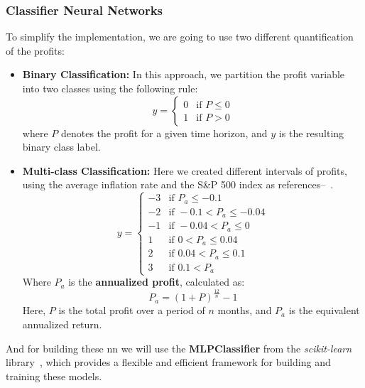 \documentclass[11pt,english,a4paper,hidelinks]{book}
\begin{document}
\subsubsection{Classifier Neural Networks}

\noindent To simplify the implementation, we are going to use two different quantification of the profits:

\begin{itemize}
    \item \textbf{Binary Classification:} In this approach, we partition the profit variable into two classes using the following rule:
    \begin{equation}
        y = 
        \begin{cases}
            0 & \text{if } P \leq 0 \\
            1 & \text{if } P > 0
        \end{cases}
    \end{equation}
    where \(P\) denotes the profit for a given time horizon, and \(y\) is the resulting binary class label.

    \item \textbf{Multi-class Classification:} Here we created different intervals of profits, using the average inflation rate and the S\&P 500 index as references--~\cite{global_inflation, sp500}.
    \begin{equation}
        y =
        \begin{cases}
            -3 & \text{if } P_a \leq -0.1 \\
            -2 & \text{if } -0.1 < P_a \leq -0.04 \\
            -1 & \text{if } -0.04 < P_a \leq 0 \\
             1 & \text{if } 0 < P_a \leq 0.04 \\
             2 & \text{if } 0.04 < P_a \leq 0.1 \\
             3 & \text{if } 0.1 < P_a
        \end{cases}
    \end{equation}
    \noindent Where \(P_a\) is the \textbf{annualized profit}, calculated as:
    \begin{equation}
        P_a = (1 + P)^{\frac{12}{n}} - 1
    \end{equation}
    \noindent Here, \(P\) is the total profit over a period of \(n\) months, and \(P_a\) is the equivalent annualized return.
\end{itemize}

\noindent And for building these \acrshort{nn} we will use the \textbf{MLPClassifier} from the \textit{scikit-learn} library~\cite{scikit2025mlpclassifier}, which provides a flexible and efficient framework for building and training these models. 
\end{document}
